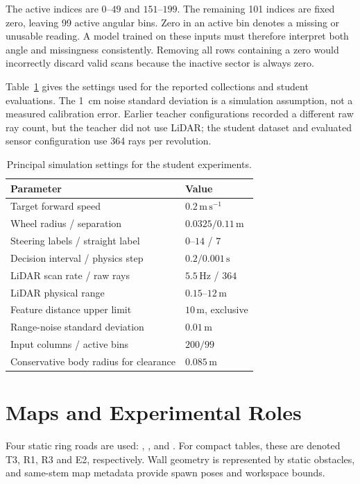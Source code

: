 The active indices are $0$--$49$ and $151$--$199$. The remaining 101 indices
are fixed zero, leaving 99 active angular bins. Zero in an active bin denotes
a missing or unusable reading. A model trained on these inputs must therefore
interpret both angle and missingness consistently. Removing all rows containing
a zero would incorrectly discard valid scans because the inactive sector is
always zero.

Table~\ref{tab:platform} gives the settings used for the reported collections
and student evaluations. The 1~cm noise standard deviation is a simulation
assumption, not a measured calibration error. Earlier teacher configurations
recorded a different raw ray count, but the teacher did not use LiDAR; the
student dataset and evaluated sensor configuration use 364 rays per revolution.

\begin{table}[htbp]
\centering\small
\caption{Principal simulation settings for the student experiments.}
\label{tab:platform}
\begin{tabularx}{\textwidth}{Xl}
\toprule Parameter & Value \\\midrule
Target forward speed & $0.2\,\mathrm{m\,s^{-1}}$ \\
Wheel radius / separation & $0.0325/0.11\,\mathrm{m}$ \\
Steering labels / straight label & $0$--$14$ / $7$ \\
Decision interval / physics step & $0.2/0.001\,\mathrm{s}$ \\
LiDAR scan rate / raw rays & $5.5\,\mathrm{Hz}$ / $364$ \\
LiDAR physical range & $0.15$--$12\,\mathrm{m}$ \\
Feature distance upper limit & $10\,\mathrm{m}$, exclusive \\
Range-noise standard deviation & $0.01\,\mathrm{m}$ \\
Input columns / active bins & $200/99$ \\
Conservative body radius for clearance & $0.085\,\mathrm{m}$ \\
\bottomrule
\end{tabularx}
\end{table}

\section{Maps and Experimental Roles}
Four static ring roads are used: ,
,  and
. For compact tables, these are denoted T3, R1, R3 and
E2, respectively. Wall geometry is represented by static obstacles, and
same-stem map metadata provide spawn poses and workspace bounds.

